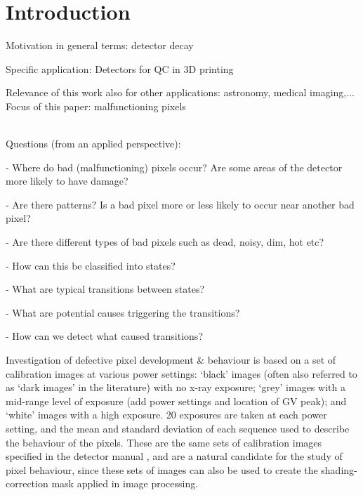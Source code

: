 \documentclass[../../IO-Pixels.tex]{subfiles}
\begin{document}
\section{Introduction}

\begin{outline}
Motivation in general terms: detector decay

Specific application: Detectors for QC in 3D printing 

Relevance of this work also for other applications: astronomy, medical imaging,...
\\

Focus of this paper: malfunctioning pixels

\\
Questions (from an applied perspective):

- Where do bad (malfunctioning) pixels occur? Are some areas of the detector more likely to have damage?

- Are there patterns? Is a bad pixel more or less likely to occur near another bad pixel?

- Are there different types of bad pixels such as dead, noisy, dim, hot etc?

- How can this be classified into states?

- What are typical transitions between states? 

- What are potential causes triggering the transitions? 

- How can we detect what caused transitions?
\end{outline}


Investigation of defective pixel development \& behaviour is based on a set of calibration images at various power settings: `black' images (often also referred to as `dark images' in the literature) with no x-ray exposure; `grey' images with a mid-range level of exposure (add power settings and location of GV peak); and `white' images with a high exposure. 20 exposures are taken at each power setting, and the mean and standard deviation of each sequence used to describe the behaviour of the pixels. These are the same sets of calibration images specified in the detector manual , and are a natural candidate for the study of pixel behaviour, since these sets of images can also be used to create the shading-correction mask applied in image processing. 
\end{document}
